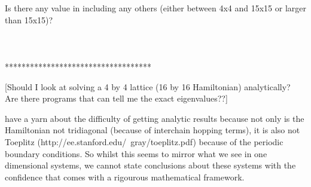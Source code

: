 \documentclass[a4paper, 10pt, draft]{article}
\theoremstyle{plain}
\begin{document}
Is there any value in including any others (either between 4x4
and 15x15 or larger than 15x15)?\\\\\\\\

***********************************


[Should I look at solving a 4 by 4 lattice (16 by 16 Hamiltonian) analytically?
Are there programs that can tell me the exact eigenvalues??]


have a yarn about the difficulty of getting analytic results because not only
is the Hamiltonian not tridiagonal (because of interchain hopping terms), it
is also not Toeplitz (http://ee.stanford.edu/~gray/toeplitz.pdf) because of
the periodic boundary conditions. So whilst this seems to mirror what we see in
one dimensional systems, we cannot state conclusions about these systems with
the confidence that comes with a rigourous mathematical framework.


\newpage




\end{document}
